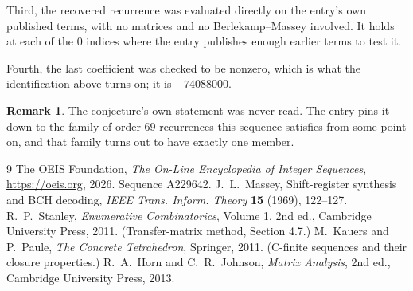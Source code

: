 \documentclass[11pt,a4paper]{article}
\theoremstyle{plain}
\theoremstyle{definition}
\newtheorem{remark}[theorem]{Remark}
\begin{document}
Third, the recovered recurrence was evaluated directly on the entry's own published terms, with
no matrices and no Berlekamp--Massey involved. It holds at each of the $0$ indices where
the entry publishes enough earlier terms to test it.

Fourth, the last coefficient was checked to be nonzero, which is what the identification above
turns on; it is $-74088000$.

\begin{remark}
The conjecture's own statement was never read. The entry pins it down to the family of
order-$69$ recurrences this sequence satisfies from some point on, and that family turns
out to have exactly one member.
\end{remark}

\begin{thebibliography}{9}
 The OEIS Foundation, \emph{The On-Line Encyclopedia of Integer
Sequences}, \url{https://oeis.org}, 2026. Sequence A229642.
 J.~L.~Massey, Shift-register synthesis and BCH decoding, \emph{IEEE
Trans. Inform. Theory} \textbf{15} (1969), 122--127.
 R.~P.~Stanley, \emph{Enumerative Combinatorics}, Volume 1, 2nd ed.,
Cambridge University Press, 2011. (Transfer-matrix method, Section 4.7.)
 M.~Kauers and P.~Paule, \emph{The Concrete Tetrahedron}, Springer, 2011.
(C-finite sequences and their closure properties.)
 R.~A.~Horn and C.~R.~Johnson, \emph{Matrix Analysis}, 2nd ed., Cambridge
University Press, 2013.
\end{thebibliography}
\end{document}
